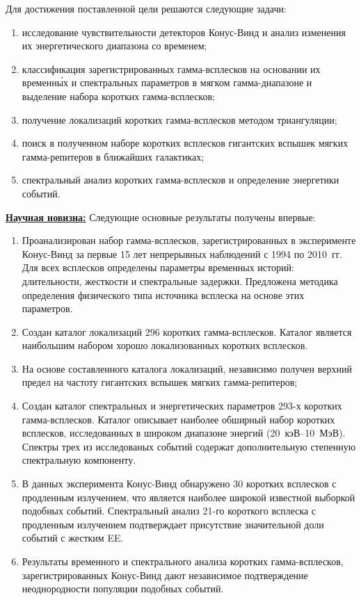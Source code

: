 Для достижения поставленной цели решаются следующие задачи:
\begin{enumerate}
\item исследование чувствительности детекторов Конус-Винд и анализ изменения 
их энергетического диапазона со временем;
\item классификация зарегистрированных гамма-всплесков на основании их временн\'{ы}х 
и спектральных параметров в мягком гамма-диапазоне и выделение набора коротких гамма-всплесков; 
\item получение локализаций коротких гамма-всплесков методом триангуляции; 
\item поиск в полученном наборе коротких всплесков гигантских 
вспышек мягких гамма-репитеров в ближайших галактиках;
\item спектральный анализ коротких гамма-всплесков и определение энергетики событий.
\end{enumerate}

\underline{\textbf{Научная новизна:}}
Следующие основные результаты получены впервые:
\begin{enumerate}
\item Проанализирован набор гамма-всплесков, зарегистрированных в эксперименте 
 Конус-Винд за первые 15 лет непрерывных наблюдений с 1994 по 2010~гг. Для всех 
 всплесков определены параметры временных историй: длительности, жесткости и спектральные задержки.
 Предложена методика определения физического типа источника всплеска на основе этих параметров.
\item Создан каталог локализаций 296 коротких гамма-всплесков. Каталог является 
 наибольшим набором хорошо локализованных коротких всплесков. 
\item На основе составленного каталога локализаций, независимо
 получен верхний предел на частоту гигантских вспышек мягких гамма-репитеров;
\item Создан каталог спектральных и энергетических параметров 293-х коротких гамма-всплесков. 
 Каталог описывает наиболее обширный набор коротких всплесков, исследованных 
 в широком диапазоне энергий (20~кэВ--10~МэВ). Спектры трех из исследованых событий 
 содержат дополнительную степенную спектральную компоненту.
\item В данных эксперимента Конус-Винд обнаружено 30 коротких всплесков с продленным излучением, 
что является наиболее широкой известной выборкой подобных событий.
Спектральный анализ 21-го короткого всплеска с продленным излучением подтверждает присутствие значительной доли 
событий с жестким EE.   
\item Результаты временного и спектрального анализа коротких гамма-всплесков, 
 зарегистрированных Конус-Винд дают независимое подтверждение неоднородности популяции подобных событий.
\end{enumerate}

